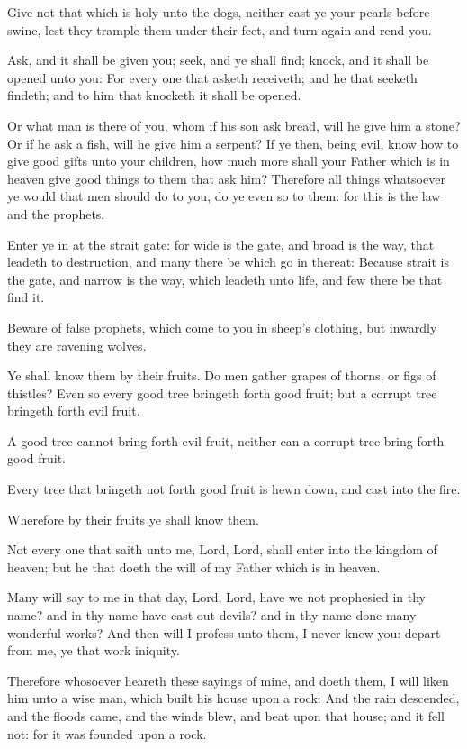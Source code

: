\Verse Give not that which is holy unto the dogs, neither cast ye your pearls before swine, lest they trample them under their feet, and turn again and rend you.

\Verse Ask, and it shall be given you; seek, and ye shall find; knock, and it shall be opened unto you: \Verse For every one that asketh receiveth; and he that seeketh findeth; and to him that knocketh it shall be opened.

\Verse Or what man is there of you, whom if his son ask bread, will he give him a stone?  \Verse Or if he ask a fish, will he give him a serpent?  \Verse If ye then, being evil, know how to give good gifts unto your children, how much more shall your Father which is in heaven give good things to them that ask him?  \Verse Therefore all things whatsoever ye would that men should do to you, do ye even so to them: for this is the law and the prophets.

\Verse Enter ye in at the strait gate: for wide is the gate, and broad is the way, that leadeth to destruction, and many there be which go in thereat: \Verse Because strait is the gate, and narrow is the way, which leadeth unto life, and few there be that find it.

\Verse Beware of false prophets, which come to you in sheep's clothing, but inwardly they are ravening wolves.

\Verse Ye shall know them by their fruits. Do men gather grapes of thorns, or figs of thistles?  \Verse Even so every good tree bringeth forth good fruit; but a corrupt tree bringeth forth evil fruit.

\Verse A good tree cannot bring forth evil fruit, neither can a corrupt tree bring forth good fruit.

\Verse Every tree that bringeth not forth good fruit is hewn down, and cast into the fire.

\Verse Wherefore by their fruits ye shall know them.

\Verse Not every one that saith unto me, Lord, Lord, shall enter into the kingdom of heaven; but he that doeth the will of my Father which is in heaven.

\Verse Many will say to me in that day, Lord, Lord, have we not prophesied in thy name? and in thy name have cast out devils? and in thy name done many wonderful works?  \Verse And then will I profess unto them, I never knew you: depart from me, ye that work iniquity.

\Verse Therefore whosoever heareth these sayings of mine, and doeth them, I will liken him unto a wise man, which built his house upon a rock: \Verse And the rain descended, and the floods came, and the winds blew, and beat upon that house; and it fell not: for it was founded upon a rock.

